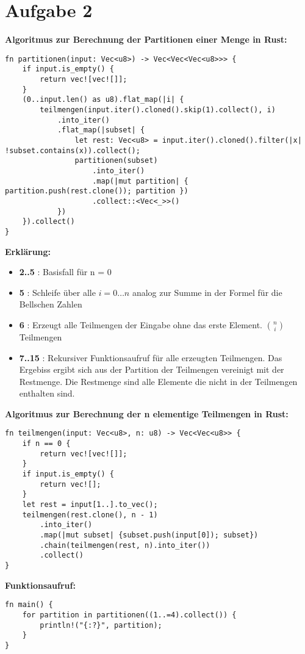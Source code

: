 \documentclass[a4paper]{scrartcl}
\begin{document}
\section*{Aufgabe 2}
\textbf{Algoritmus zur Berechnung der Partitionen einer Menge in Rust:}
\begin{lstlisting}
fn partitionen(input: Vec<u8>) -> Vec<Vec<Vec<u8>>> {
    if input.is_empty() {
        return vec![vec![]];
    }
    (0..input.len() as u8).flat_map(|i| {
        teilmengen(input.iter().cloned().skip(1).collect(), i)
            .into_iter()
            .flat_map(|subset| {
                let rest: Vec<u8> = input.iter().cloned().filter(|x| !subset.contains(x)).collect();
                partitionen(subset)
                    .into_iter()
                    .map(|mut partition| { partition.push(rest.clone()); partition })
                    .collect::<Vec<_>>()
            })
    }).collect()
} 
\end{lstlisting}
\newpage
\textbf{Erklärung:}
\begin{itemize}
    \item \textbf{2..5} : Basisfall für n = 0
    \item \textbf{5} : Schleife über alle $ i = 0 \ldots n $ analog zur Summe in der Formel für die Bellschen Zahlen
    \item \textbf{6} : Erzeugt alle Teilmengen der Eingabe ohne das erste Element. $\binom{n}{i}$ Teilmengen
    \item \textbf{7..15} : Rekursiver Funktionsaufruf für alle erzeugten Teilmengen. Das Ergebiss ergibt sich aus der Partition der Teilmengen vereinigt mit der Restmenge. 
    Die Restmenge sind alle Elemente die nicht in der Teilmengen enthalten sind.
\end{itemize}

\textbf{Algoritmus zur Berechnung der n elementige Teilmengen in Rust:}
\begin{lstlisting}
fn teilmengen(input: Vec<u8>, n: u8) -> Vec<Vec<u8>> {
    if n == 0 {
        return vec![vec![]];
    }  
    if input.is_empty() {
        return vec![];
    }
    let rest = input[1..].to_vec();
    teilmengen(rest.clone(), n - 1)
        .into_iter()
        .map(|mut subset| {subset.push(input[0]); subset})
        .chain(teilmengen(rest, n).into_iter())
        .collect()
}
\end{lstlisting}

\textbf{Funktionsaufruf:}
\begin{lstlisting}
fn main() {
    for partition in partitionen((1..=4).collect()) {
        println!("{:?}", partition);
    }
}
\end{lstlisting}
\end{document}
